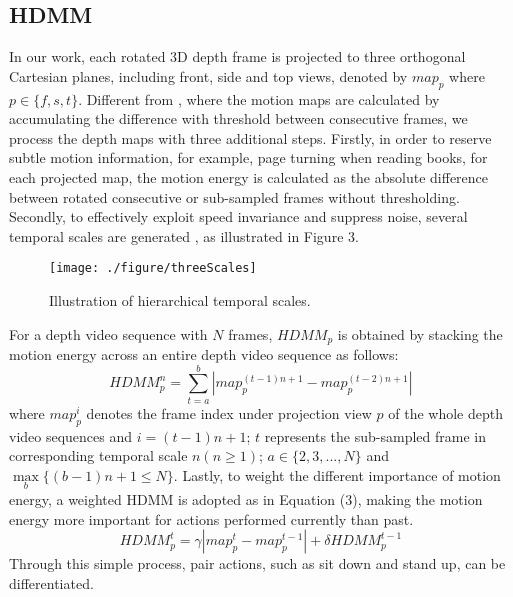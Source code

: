 \documentclass[conference]{IEEEtran}
\begin{document}
\subsection{HDMM}

In our work, each rotated 3D depth frame is projected to three orthogonal Cartesian planes, including front, side and top views, denoted by $map_{p}$ where $p \in \{f, s, t\}$. Different from \cite{Yang2012a}, where the motion maps are calculated by accumulating the difference with threshold between consecutive frames, we process the depth maps with three additional steps. Firstly, in order to reserve subtle motion information, for example, page turning when reading books, for each projected map, the motion energy is calculated as the absolute difference between rotated consecutive or sub-sampled frames without thresholding. Secondly, to effectively exploit speed invariance and suppress noise, several temporal scales are generated , as illustrated in Figure 3. 
\begin{figure}[!ht]
\begin{center}{\texttt{[image: ./figure/threeScales]}}
\end{center}
\caption{Illustration of hierarchical temporal scales.}
\label{fig:framework}
\end{figure}
For a depth video sequence with $N$ frames, $HDMM_{p}$ is obtained by stacking the motion energy across an entire depth video sequence as follows:
\begin{equation}
HDMM_{p}^{n} = \sum_{t=a}^{b} \left| map_{p}^{(t-1)n + 1} - map_{p}^{(t-2)n + 1} \right|
\end{equation}
where $map_{p}^{i}$ denotes the frame index under projection view $p$ of the whole depth video sequences and $i = (t-1)n + 1$; $t$ represents the sub-sampled frame in corresponding temporal scale $n (n \geq 1)$; $a \in \{2, 3, ..., N\}$ and $\max \limits_{b}\{(b - 1)n + 1 \leq N\}$. Lastly, to weight the different importance of motion energy, a weighted HDMM is adopted as in Equation (3), making the motion energy more important for actions performed currently than past.
\begin{equation}
HDMM_{p}^{t} = \gamma \left| map_{p}^{t} - map_{p}^{t-1} \right | + \delta HDMM_{p}^{t-1}
\end{equation}
Through this simple process, pair actions, such as sit down and stand up, can be differentiated. 
\end{document}
